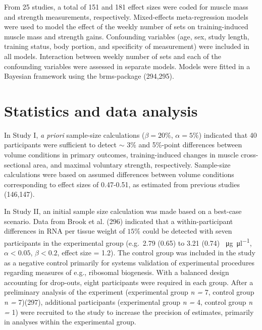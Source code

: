 \documentclass[twoside,10pt]{gihclass} %
\begin{document}
From 25 studies, a total of 151 and 181 effect sizes were coded for muscle mass and strength measurements, respectively. Mixed-effects meta-regression models were used to model the effect of the weekly number of sets on training-induced muscle mass and strength gains.
Confounding variables (age, sex, study length, training status, body portion, and specificity of measurement) were included in all models. Interaction between weekly number of sets and each of the confounding variables were assessed in separate models.
Models were fitted in a Bayesian framework using the brms-package
(294,295).

\hypertarget{statistics-and-data-analysis}{%
\section{Statistics and data analysis}\label{statistics-and-data-analysis}}

In Study I, \emph{a priori} sample-size calculations (\(\beta=20\%\), \(\alpha=5\%\)) indicated that 40 participants were sufficient to detect \(\sim\) 3\% and 5\%-point differences between volume conditions in primary outcomes, training-induced changes in muscle cross-sectional area, and maximal voluntary strength, respectively. Sample-size calculations were based on assumed differences between volume conditions corresponding to effect sizes of 0.47-0.51, as estimated from previous studies (146,147).

In Study II, an initial sample size calculation was made based on a best-case scenario. Data from Brook et al. (296) indicated that a within-participant differences in RNA per tissue weight of \(15\%\) could be detected with seven participants in the experimental group (e.g.~2.79 (0.65) to 3.21 (0.74) \SI{}{\micro\gram\per\micro\litre}, \(\alpha<0.05\), \(\beta<0.2\), effect size = 1.2). The control group was included in the study as a negative control primarily for systems validation of experimental procedures regarding measures of e.g., ribosomal biogenesis. With a balanced design accounting for drop-outs, eight participants were required in each group. After a preliminary analysis of the experiment (experimental group \emph{n = }7, control group \emph{n = }7)(297), additional participants (experimental group \emph{n =} 4, control group \emph{n = }1) were recruited to the study to increase the precision of estimates, primarily in analyses within the experimental group.
\end{document}
